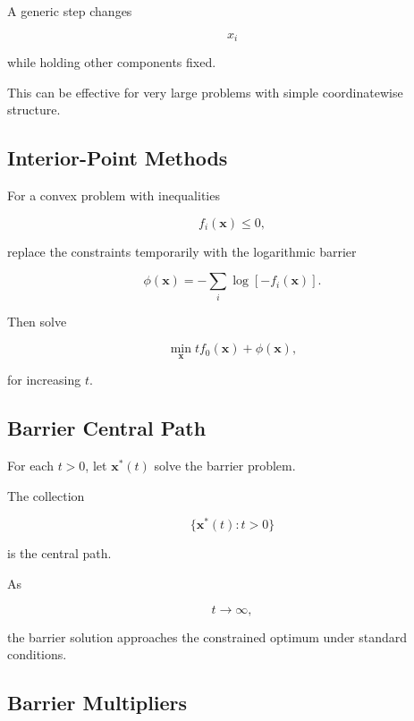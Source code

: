 A generic step changes

\[
\boxed{
x_i
}
\]

while holding other components fixed.

This can be effective for very large problems with simple coordinatewise
structure.

\subsection{Interior-Point Methods}
\label{subsec:convex-interior-point}

For a convex problem with inequalities

\[
f_i(\mathbf{x})\leq0,
\]

replace the constraints temporarily with the logarithmic barrier

\[
\boxed{
\phi(\mathbf{x})
=
-
\sum_i
\log
[
-f_i(\mathbf{x})
].
}
\]

Then solve

\[
\boxed{
\min_{\mathbf{x}}
t f_0(\mathbf{x})
+
\phi(\mathbf{x}),
}
\]

for increasing \(t\).

\subsection{Barrier Central Path}
\label{subsec:convex-barrier-central-path}

For each \(t>0\), let \(\mathbf{x}^*(t)\) solve the barrier problem.

The collection

\[
\boxed{
\{
\mathbf{x}^*(t):
t>0
\}
}
\]

is the central path.

As

\[
t\to\infty,
\]

the barrier solution approaches the constrained optimum under standard
conditions.

\subsection{Barrier Multipliers}
\label{subsec:barrier-multipliers}

